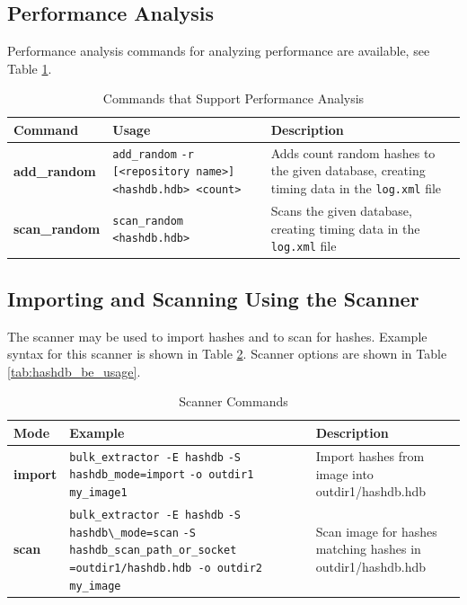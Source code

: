 \documentclass[11pt,fleqn]{article} %
\begin{document}
\subsection{Performance Analysis}
Performance analysis commands for analyzing \hdb performance are available, see Table \ref{tab:analysis}.

\begin{table}[!ht]
\centering
\caption{Commands that Support \hdb Performance Analysis}
\label{tab:analysis}
\begin{tabular}{|p{3.5 cm}|p{6 cm}|p{4 cm}|}
\hline \hline
\textbf{Command} & \textbf{Usage} & \textbf{Description} \\
\hline
\textbf{add\_random} & \verb+add_random+ \verb+-r [<repository name>]+ \verb+<hashdb.hdb> <count>+ & Adds count random hashes to the given database, creating timing data in the \texttt{log.xml} file\\
\hline
\textbf{scan\_random} & \verb+scan_random <hashdb.hdb>+ & Scans the given database, creating timing data in the \texttt{log.xml} file\\
\hline
\end{tabular}
\end{table}

\subsection{Importing and Scanning Using the \bulk \hdb Scanner}
\label{ImportingAndScanning}
The \bulk \hdb scanner may be used to import hashes and to scan for hashes.
Example syntax for this scanner is shown in Table \ref{tab:hashdbScanner}.
Scanner options are shown in Table \ref{tab:hashdb_be_usage}.

\begin{table}[!ht]
\centering
\caption{\bulk \hdb Scanner Commands}
\label{tab:hashdbScanner}
\begin{tabular}{|p{3.5 cm}|p{6 cm}|p{4 cm}|}
\hline \hline
\textbf{Mode} & \textbf{Example} & \textbf{Description} \\
\hline
\textbf{import} & \verb+bulk_extractor -E hashdb+ \verb+-S hashdb_mode=import+ \verb+-o outdir1 my_image1+ & Import hashes from image into outdir1/hashdb.hdb\\
\hline
\textbf{scan} & \verb+bulk_extractor -E hashdb+ \verb+-S hashdb\_mode=scan+ \verb+-S hashdb_scan_path_or_socket+ \verb+=outdir1/hashdb.hdb -o outdir2+ \verb+my_image+ & Scan image for hashes matching hashes in outdir1/hashdb.hdb\\
\hline
\end{tabular}
\end{table}
\end{document}
